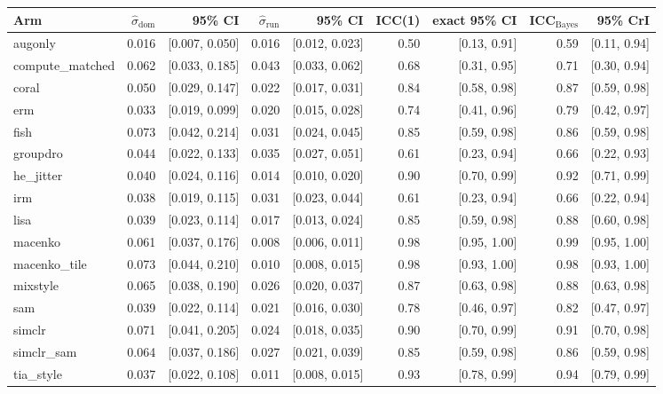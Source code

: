 \begin{tabular}{lrrrrrrrr}
\toprule
Arm & $\hat\sigma_\text{dom}$ & 95\% CI & $\hat\sigma_\text{run}$ & 95\% CI & ICC(1) & exact 95\% CI & ICC$_\text{Bayes}$ & 95\% CrI \\
\midrule
augonly & 0.016 & [0.007, 0.050] & 0.016 & [0.012, 0.023] & 0.50 & [0.13, 0.91] & 0.59 & [0.11, 0.94] \\
compute\_matched & 0.062 & [0.033, 0.185] & 0.043 & [0.033, 0.062] & 0.68 & [0.31, 0.95] & 0.71 & [0.30, 0.94] \\
coral & 0.050 & [0.029, 0.147] & 0.022 & [0.017, 0.031] & 0.84 & [0.58, 0.98] & 0.87 & [0.59, 0.98] \\
erm & 0.033 & [0.019, 0.099] & 0.020 & [0.015, 0.028] & 0.74 & [0.41, 0.96] & 0.79 & [0.42, 0.97] \\
fish & 0.073 & [0.042, 0.214] & 0.031 & [0.024, 0.045] & 0.85 & [0.59, 0.98] & 0.86 & [0.59, 0.98] \\
groupdro & 0.044 & [0.022, 0.133] & 0.035 & [0.027, 0.051] & 0.61 & [0.23, 0.94] & 0.66 & [0.22, 0.93] \\
he\_jitter & 0.040 & [0.024, 0.116] & 0.014 & [0.010, 0.020] & 0.90 & [0.70, 0.99] & 0.92 & [0.71, 0.99] \\
irm & 0.038 & [0.019, 0.115] & 0.031 & [0.023, 0.044] & 0.61 & [0.23, 0.94] & 0.66 & [0.22, 0.94] \\
lisa & 0.039 & [0.023, 0.114] & 0.017 & [0.013, 0.024] & 0.85 & [0.59, 0.98] & 0.88 & [0.60, 0.98] \\
macenko & 0.061 & [0.037, 0.176] & 0.008 & [0.006, 0.011] & 0.98 & [0.95, 1.00] & 0.99 & [0.95, 1.00] \\
macenko\_tile & 0.073 & [0.044, 0.210] & 0.010 & [0.008, 0.015] & 0.98 & [0.93, 1.00] & 0.98 & [0.93, 1.00] \\
mixstyle & 0.065 & [0.038, 0.190] & 0.026 & [0.020, 0.037] & 0.87 & [0.63, 0.98] & 0.88 & [0.63, 0.98] \\
sam & 0.039 & [0.022, 0.114] & 0.021 & [0.016, 0.030] & 0.78 & [0.46, 0.97] & 0.82 & [0.47, 0.97] \\
simclr & 0.071 & [0.041, 0.205] & 0.024 & [0.018, 0.035] & 0.90 & [0.70, 0.99] & 0.91 & [0.70, 0.98] \\
simclr\_sam & 0.064 & [0.037, 0.186] & 0.027 & [0.021, 0.039] & 0.85 & [0.59, 0.98] & 0.86 & [0.59, 0.98] \\
tia\_style & 0.037 & [0.022, 0.108] & 0.011 & [0.008, 0.015] & 0.93 & [0.78, 0.99] & 0.94 & [0.79, 0.99] \\
\bottomrule
\end{tabular}
